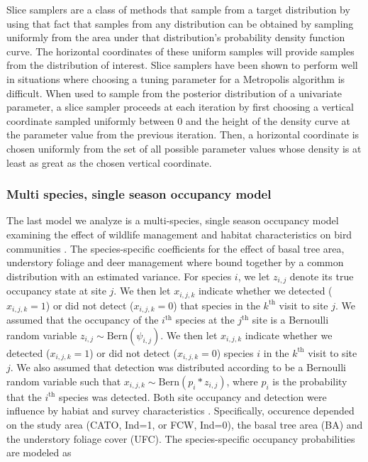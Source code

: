 \documentclass[12pt]{article}
\begin{document}
Slice samplers are a class of methods that sample from a target
distribution by using that fact that samples from any distribution can
be obtained by sampling uniformly from the area under that
distribution's probability density function curve.  The horizontal
coordinates of these uniform samples will provide samples from the
distribution of interest. Slice samplers have been shown to perform
well in situations where choosing a tuning parameter for a Metropolis
algorithm is difficult. When used to sample from the posterior
distribution of a univariate parameter, a slice sampler proceeds at
each iteration by first choosing a vertical coordinate sampled
uniformly between 0 and the height of the density curve at the
parameter value from the previous iteration.  Then, a horizontal
coordinate is chosen uniformly from the set of all possible parameter
values whose density is at least as great as the chosen vertical
coordinate.

\subsubsection*{Multi species, single season occupancy model}
\label{sec:msss}

The last model we analyze is a multi-species, single season occupancy
model examining the effect of wildlife management and habitat
characteristics on bird communities \citep{zipkin2010multi}. The
species-specific coefficients for the effect of basal tree area,
understory foliage and deer management where bound together by a
common distribution with an estimated variance.  For species $i$, we
let $z_{i,j}$ denote its true occupancy state at site $j$.  We then
let $x_{i,j,k}$ indicate whether we detected ($x_{i,j,k}=1$) or did
not detect ($x_{i,j,k}=0$) that species in the $k^{\mathrm{th}}$ visit
to site $j$.  We assumed that the occupancy of the $i^{\mathrm{th}}$
species at the $j^{\mathrm{th}}$ site is a Bernoulli random variable
$z_{i,j} \sim \mathrm{Bern}(\psi_{i,j})$. We then let $x_{i,j,k}$
indicate whether we detected ($x_{i,j,k}=1$) or did not detect
($x_{i,j,k}=0$) species $i$ in the $k^{\mathrm{th}}$ visit to site
$j$. We also assumed that detection was distributed according to be a
Bernoulli random variable such that $x_{i,j,k} \sim
\mathrm{Bern}(p_{i}*z_{i,j})$, where $p_{i}$ is the probability that
the $i^{\mathrm{th}}$ species was detected. Both site occupancy and
detection were influence by habiat and survey characteristics
\citep{zipkin2010multi}. Specifically, occurence depended on the study
area (CATO, Ind=1, or FCW, Ind=0), the basal tree area (BA) and the
understory foliage cover (UFC). The species-specific occupancy
probabilities are modeled as
\end{document}
